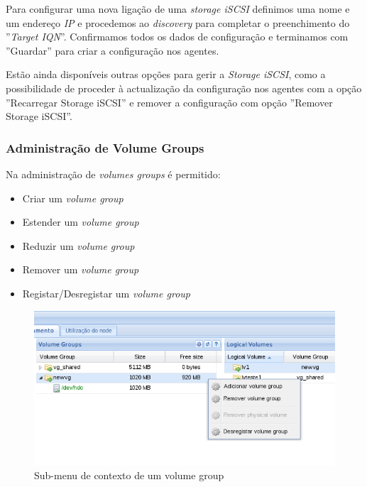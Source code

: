 Para configurar uma nova ligação de uma \emph{storage iSCSI} definimos uma nome e um endereço \emph{IP} e procedemos ao \emph{discovery} para completar o preenchimento do ''\emph{Target IQN}''. Confirmamos todos os dados de configuração e terminamos com ''Guardar'' para criar a configuração nos agentes.

Estão ainda disponíveis outras opções para gerir a \emph{Storage iSCSI}, como a possibilidade de proceder à actualização da configuração nos agentes com a opção ''Recarregar Storage iSCSI'' e remover a configuração com opção ''Remover Storage iSCSI''.


\subsubsection{Administração de Volume Groups}
Na administração de \emph{volumes groups} é permitido:
\begin{itemize}
	\item Criar um \emph{volume group}
	\item Estender um \emph{volume group}
	\item Reduzir um \emph{volume group}
	\item Remover um \emph{volume group}
    \item Registar/Desregistar um \emph{volume group}
\end{itemize}

\begin{figure}[H]
        \begin{center}
        \includegraphics[scale=0.45]{screenshots/node_storage_vg_ctx.png}
        \caption{Sub-menu de contexto de um volume group}
        \label{fig:storage_vg_ctx}
        \end{center}
\end{figure}

